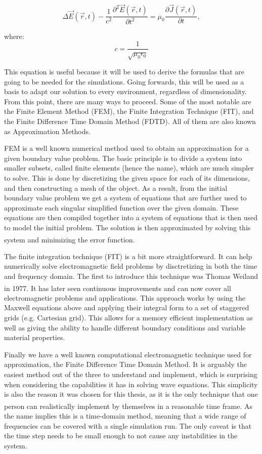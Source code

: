 \begin{equation}
	\label{eqn:waveEquation}
	\Delta\vec{E}(\vec{r},t) - \frac{1}{c^2} \frac{\partial^2 \vec{E}(\vec{r},t)}{\partial t^2} = \mu_{0} \frac{\partial \vec{J}(\vec{r},t)}{\partial t},
\end{equation}

where: $$c = \frac{1}{\sqrt{\mu_{0}\epsilon_{0}}}$$

This equation is useful because it will be used to derive the formulas that are going to be needed for the simulations. Going forwards, this will be used as a basis to adapt our solution to every environment, regardless of dimensionality. From this point, there are many ways to proceed. Some of the most notable are the Finite Element Method (FEM), the Finite Integration Technique (FIT), and the Finite Difference Time Domain Method (FDTD). All of them are also known as Approximation Methods.

FEM is a well known numerical method used to obtain an approximation for a given boundary value problem. The basic principle is to divide a system into smaller subsets, called finite elements (hence the name), which are much simpler to solve. This is done by discretizing the given space for each of its dimensions, and then constructing a mesh of the object. As a result, from the initial boundary value problem we get a system of equations that are further used to approximate each singular simplified function over the given domain. These equations are then compiled together into a system of equations that is then used to model the initial problem. The solution is then approximated by solving this system and minimizing the error function.\textsuperscript{\cite{logan2011first}}

The finite integration technique (FIT) is a bit more straightforward. It can help numerically solve electromagnetic field problems by disctretizing in both the time and frequency domain. The first to introduce this technique was Thomas Weiland in 1977.\textsuperscript{\cite{weiland1977discretization}} It has later seen continuous improvements and can now cover all electromagnetic problems and applications. This approach works by using the Maxwell equations above and applying their integral form to a set of staggered grids (e.g. Cartesian grid). This allows for a memory efficient implementation as well as giving the ability to handle different boundary conditions and variable material properties.

Finally we have a well known computational electromagnetic technique used for approximation, the Finite Difference Time Domain Method. It is arguably the easiest method out of the three to understand and implement, which is surprising when considering the capabilities it has in solving wave equations. This simplicity is also the reason it was chosen for this thesis, as it is the only technique that one person can realistically implement by themselves in a reasonable time frame.\textsuperscript{\cite{davidson2010computational}} As the name implies this is a time-domain method, meaning that a wide range of frequencies can be covered with a single simulation run. The only caveat is that the time step needs to be small enough to not cause any instabilities in the system.

